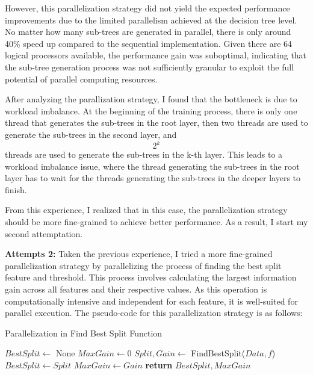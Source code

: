 \documentclass[13pt]{article}
\begin{document}
However, this parallelization strategy did not yield the expected performance improvements due to the limited parallelism achieved at the decision tree level. 
No matter how many sub-trees are generated in parallel, there is only around 40\% speed up compared to the sequential implementation.
Given there are 64 logical processors available, the performance gain was suboptimal, indicating that the sub-tree generation process was not sufficiently granular to exploit the full potential of parallel computing resources.

After analyzing the parallization strategy, I found that the bottleneck is due to workload imbalance.
At the beginning of the training process, there is only one thread that generates the sub-trees in the root layer, then two threads are used to generate the sub-trees in the second layer, and $$2^{k}$$ threads are used to generate the sub-trees in the k-th layer.
This leads to a workload imbalance issue, where the thread generating the sub-trees in the root layer has to wait for the threads generating the sub-trees in the deeper layers to finish.

From this experience, I realized that in this case, the parallelization strategy should be more fine-grained to achieve better performance.
As a result, I start my second attemptation.

\textbf{Attempts 2: }
Taken the previous experience, I tried a more fine-grained parallelization strategy by parallelizing the process of finding the best split feature and threshold.
This process involves calculating the largest information gain across all features and their respective values. As this operation is computationally intensive and independent for each feature, it is well-suited for parallel execution.
The pseudo-code for this parallelization strategy is as follows:

\begin{algorithm}[h!]
    \caption{Parallelization in Find Best Split Function}\label{alg:split}
    \begin{algorithmic}[1]
        \State $BestSplit \gets$ None
        \State $MaxGain \gets 0$
            \State \color{red} $Split, Gain \gets$ FindBestSplit($Data, f$) \color{black}
                \State $BestSplit \gets Split$
                \State $MaxGain \gets Gain$
            \EndIf
        \EndFor
        \State \textbf{return} $BestSplit, MaxGain$
    \EndProcedure
    \end{algorithmic}
\end{algorithm}
\end{document}
